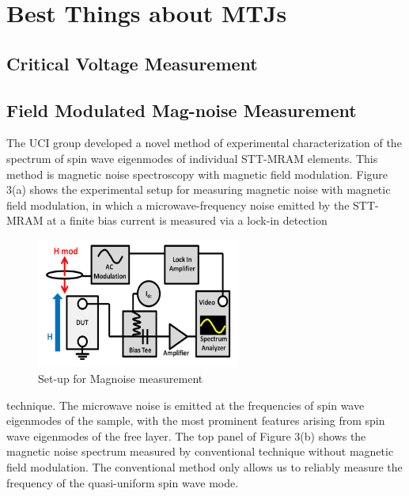 \chapter{Best Things about MTJs}


\section{Critical Voltage Measurement}




\section{Field Modulated Mag-noise Measurement}



The UCI group developed a novel method of experimental characterization of the spectrum of spin wave eigenmodes of individual STT-MRAM elements. This method is magnetic noise spectroscopy with magnetic field modulation. Figure 3(a) shows the experimental setup for measuring magnetic noise with magnetic field modulation, in which a microwave-frequency noise emitted by the STT-MRAM at a finite bias current is measured via a lock-in detection

\begin{figure}[!ht]
  \centering
  \includegraphics[width=0.6\textwidth]{fig/magnoise/Picture1.png}
   \caption{Set-up for Magnoise measurement}
  \label{fig:magnoise-setup}
\end{figure}

technique. The microwave noise is emitted at the frequencies of spin wave eigenmodes of the sample, with the most prominent features arising from spin wave eigenmodes of the free layer. The top panel of Figure 3(b) shows the magnetic noise spectrum measured by conventional technique without magnetic field modulation. The conventional method only allows us to reliably measure the frequency of the quasi-uniform spin wave mode. 






